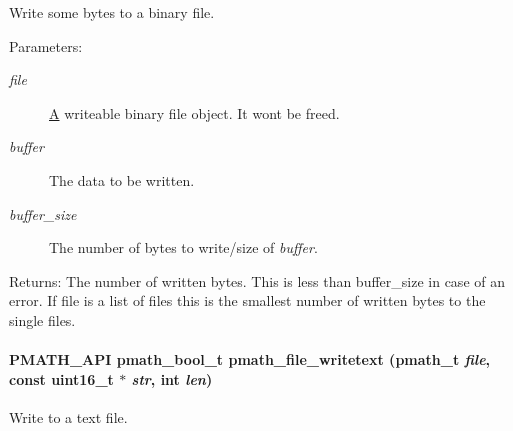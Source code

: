 Write some bytes to a binary file. 

\begin{Desc}
\item[Parameters:]
\begin{description}
\item[{\em file}]\hyperlink{class_a}{A} writeable binary file object. It wont be freed. \item[{\em buffer}]The data to be written. \item[{\em buffer\_\-size}]The number of bytes to write/size of {\em buffer\/}. \end{description}
\end{Desc}
\begin{Desc}
\item[Returns:]The number of written bytes. This is less than buffer\_\-size in case of an error. If file is a list of files this is the smallest number of written bytes to the single files. \end{Desc}
\hypertarget{group__file__api_g09096caebfcdfeb74c8f3845ff2ff262}{
\paragraph[{pmath\_\-file\_\-writetext}]{\setlength{\rightskip}{0pt plus 5cm}PMATH\_\-API {\bf pmath\_\-bool\_\-t} pmath\_\-file\_\-writetext ({\bf pmath\_\-t} {\em file}, \/  const uint16\_\-t $\ast$ {\em str}, \/  int {\em len})}\hfill}
\label{group__file__api_g09096caebfcdfeb74c8f3845ff2ff262}


Write to a text file. 

